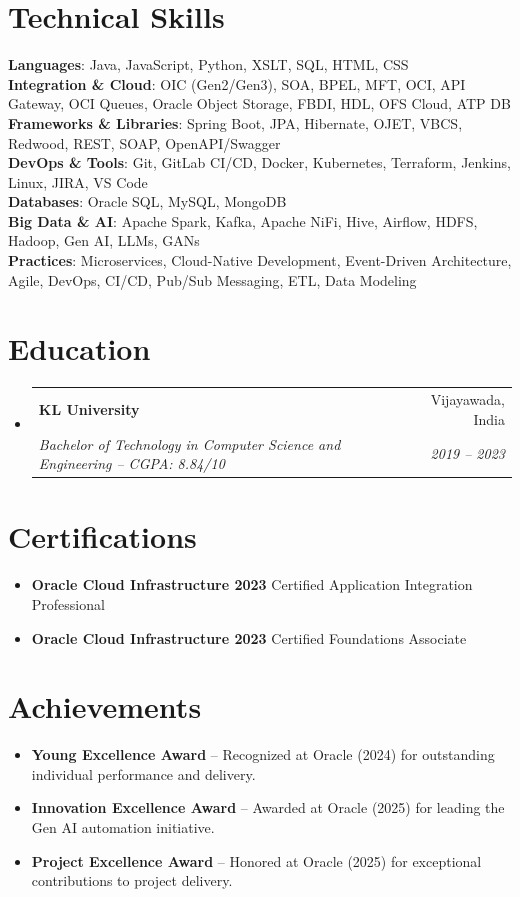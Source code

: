 \documentclass[letterpaper,11pt]{article}
\makeatletter
\newcommand{\resumeItem}[1]{
  \item\small{
    {#1 \vspace{-2pt}}
  }
}
\newcommand{\resumeSubheading}[4]{
  \vspace{-2pt}\item
    \begin{tabular*}{0.97\textwidth}[t]{l@{\extracolsep{\fill}}r}
      \textbf{#1} & #2 \\
      \textit{\small#3} & \textit{\small #4} \\
    \end{tabular*}\vspace{-7pt}
}
\newcommand{\resumeSubHeadingListStart}{\begin{itemize}[leftmargin=0.15in, label={}]}
\newcommand{\resumeSubHeadingListEnd}{\end{itemize}}
\newcommand{\resumeItemListStart}{\begin{itemize}}
\newcommand{\resumeItemListEnd}{\end{itemize}\vspace{-5pt}}
\makeatother
\begin{document}
\section{Technical Skills}
\begin{itemize}[leftmargin=0.15in, label={}]
    \small{\item{
        \textbf{Languages}{: Java, JavaScript, Python, XSLT, SQL, HTML, CSS} \\
        \textbf{Integration \& Cloud}{: OIC (Gen2/Gen3), SOA, BPEL, MFT, OCI, API Gateway, OCI Queues, Oracle Object Storage, FBDI, HDL, OFS Cloud, ATP DB} \\
        \textbf{Frameworks \& Libraries}{: Spring Boot, JPA, Hibernate, OJET, VBCS, Redwood, REST, SOAP, OpenAPI/Swagger} \\
        \textbf{DevOps \& Tools}{: Git, GitLab CI/CD, Docker, Kubernetes, Terraform, Jenkins, Linux, JIRA, VS Code} \\
        \textbf{Databases}{: Oracle SQL, MySQL, MongoDB} \\
        \textbf{Big Data \& AI}{: Apache Spark, Kafka, Apache NiFi, Hive, Airflow, HDFS, Hadoop, Gen AI, LLMs, GANs} \\
        \textbf{Practices}{: Microservices, Cloud-Native Development, Event-Driven Architecture, Agile, DevOps, CI/CD, Pub/Sub Messaging, ETL, Data Modeling}
    }}
\end{itemize}

\section{Education}
\resumeSubHeadingListStart
    \resumeSubheading
        {KL University}{Vijayawada, India}
        {Bachelor of Technology in Computer Science and Engineering -- CGPA: 8.84/10}{2019 -- 2023}
\resumeSubHeadingListEnd

\section{Certifications}
\resumeItemListStart
    \resumeItem{\textbf{Oracle Cloud Infrastructure 2023} Certified Application Integration Professional}
    \resumeItem{\textbf{Oracle Cloud Infrastructure 2023} Certified Foundations Associate}
\resumeItemListEnd

\section{Achievements}
\resumeItemListStart
    \resumeItem{\textbf{Young Excellence Award} -- Recognized at Oracle (2024) for outstanding individual performance and delivery.}
    \resumeItem{\textbf{Innovation Excellence Award} -- Awarded at Oracle (2025) for leading the Gen AI automation initiative.}
    \resumeItem{\textbf{Project Excellence Award} -- Honored at Oracle (2025) for exceptional contributions to project delivery.}
\resumeItemListEnd
\end{document}
